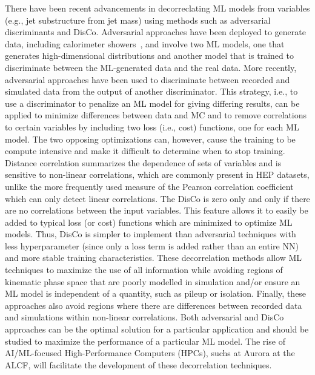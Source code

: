 \documentclass[letter, USenglish, 11pt, subfigure]{article}
\begin{document}
There have been recent advancements in decorreclating ML models from variables (e.g., jet substructure from jet mass) using methods such as adversarial discriminants and DisCo. 
Adversarial approaches have been deployed to generate data, including calorimeter showers~\cite{calogan,fastsim3}, and involve two ML models, one that generates high-dimensional distributions and another model that is trained to discriminate between the ML-generated data and the real data. More recently, adversarial approaches have been used to discriminate between recorded and simulated data from the output of another discriminator. This strategy, i.e., to use a discriminator to penalize an ML model for giving differing results, can be applied to minimize differences between data and MC and to remove correlations to certain variables by including two loss (i.e., cost) functions, one for each ML model. The two opposing optimizations can, however, cause the training to be compute intensive and make it difficult to determine when to stop training. 
Distance correlation summarizes the dependence of sets of variables and is sensitive to non-linear correlations, which are commonly present in HEP datasets, unlike the more frequently used measure of the Pearson correlation coefficient which can only detect linear correlations. The DisCo is zero only and only if there are no correlations between the input variables. This feature allows it to easily be added to typical loss (or cost) functions which are minimized to optimize ML models. Thus, DisCo is simpler to implement than adversarial techniques with less hyperparameter (since only a loss term is added rather than an entire NN) and more stable training characteristics. %
These decorrelation methods allow ML techniques to maximize the use of all information while avoiding regions of kinematic phase space that are poorly modelled in simulation and/or ensure an ML model is independent of a quantity, such as pileup or isolation. Finally, these approaches also avoid regions where there are differences between recorded data and simulations within non-linear correlations. Both adversarial and DisCo approaches can be the optimal solution for a particular application and should be studied to maximize the performance of a particular ML model. The rise of AI/ML-focused High-Performance Computers (HPCs), suchs at Aurora at the ALCF, will facilitate the development of these decorrelation techniques. 
\end{document}
